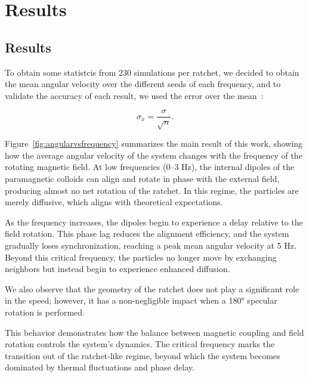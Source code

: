 \part{Results}
\label{part:results}

\chapter{Results}

To obtain some statistcis from 230 simulations per ratchet, we decided to obtain the mean angular velocity over the different seeds of each frequency, and to validate the accuracy of each result, we used the error over the mean~\cite{altman2005standard}:

\begin{equation}
  \sigma_{\bar{x}} = \displaystyle\frac{\sigma}{\sqrt{n}}.
  \label{eq:errormean}
\end{equation}

Figure~\ref{fig:angularvsfrequency} summarizes the main result of this work, showing how the average angular velocity of the system changes with the frequency of the rotating magnetic field. At low frequencies (0–3 Hz), the internal dipoles of the paramagnetic colloids can align and rotate in phase with the external field, producing almost no net rotation of the ratchet. In this regime, the particles are merely diffusive, which aligns with theoretical expectations.

As the frequency increases, the dipoles begin to experience a delay relative to the field rotation. This phase lag reduces the alignment efficiency, and the system gradually loses synchronization, reaching a peak mean angular velocity at 5 Hz. Beyond this critical frequency, the particles no longer move by exchanging neighbors but instead begin to experience enhanced diffusion.

We also observe that the geometry of the ratchet does not play a significant role in the speed; however, it has a non-negligible impact when a 180° specular rotation is performed.

This behavior demonstrates how the balance between magnetic coupling and field rotation controls the system's dynamics. The critical frequency marks the transition out of the ratchet-like regime, beyond which the system becomes dominated by thermal fluctuations and phase delay.


